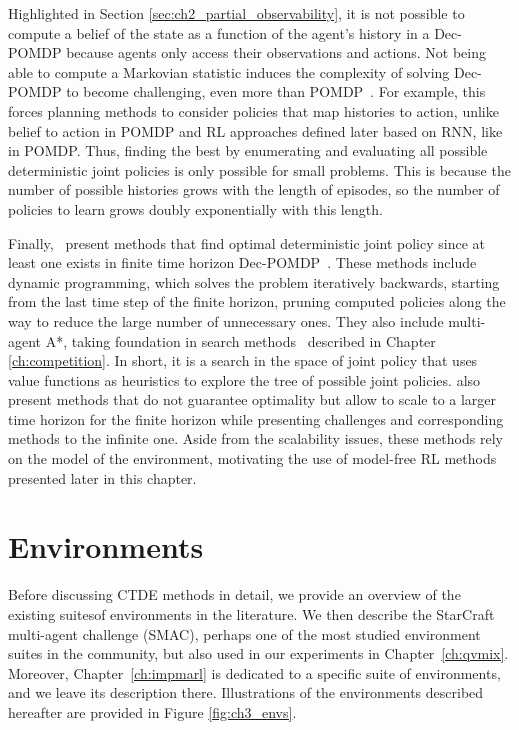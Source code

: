 Highlighted in Section \ref{sec:ch2_partial_observability}, it is not possible to compute a belief of the state as a function of the agent's history in a Dec-POMDP because agents only access their observations and actions.
Not being able to compute a Markovian statistic induces the complexity of solving Dec-POMDP to become challenging, even more than POMDP~\citep{DecPomdp}.
For example, this forces planning methods to consider policies that map histories to action, unlike belief to action in POMDP and RL approaches defined later based on RNN, like in POMDP.
Thus, finding the best by enumerating and evaluating all possible deterministic joint policies is only possible for small problems.
This is because the number of possible histories grows with the length of episodes, so the number of policies to learn grows doubly exponentially with this length.

Finally,~\cite{DecPomdp} present methods that find optimal deterministic joint policy since at least one exists in finite time horizon Dec-POMDP~\citep{oliehoek2008optimal}.
These methods include dynamic programming, which solves the problem iteratively backwards, starting from the last time step of the finite horizon, pruning computed policies along the way to reduce the large number of unnecessary ones.
They also include multi-agent A*, taking foundation in search methods~\citep{russel2010} described in Chapter \ref{ch:competition}.
In short, it is a search in the space of joint policy that uses value functions as heuristics to explore the tree of possible joint policies.
\cite{DecPomdp} also present methods that do not guarantee optimality but allow to scale to a larger time horizon for the finite horizon while presenting challenges and corresponding methods to the infinite one.
Aside from the scalability issues, these methods rely on the model of the environment, motivating the use of model-free RL methods presented later in this chapter.

\section{Environments}
\label{sec:ch3_env}
Before discussing CTDE methods in detail, we provide an overview of the existing suites\footnotemark of environments in the literature.
We then describe the StarCraft multi-agent challenge (SMAC), perhaps one of the most studied environment suites in the community, but also used in our experiments in Chapter~\ref{ch:qvmix}.
Moreover, Chapter~\ref{ch:impmarl} is dedicated to a specific suite of environments, and we leave its description there.
Illustrations of the environments described hereafter are provided in Figure \ref{fig:ch3_envs}.

